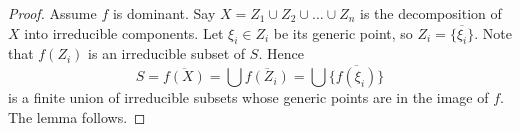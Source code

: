 \documentclass[10pt,a4paper]{amsart}
\theoremstyle{plain}
\theoremstyle{definition}
\theoremstyle{remark}
\numberwithin{equation}{subsection}
\begin{document}
\begin{proof}
Assume $f$ is dominant.
Say $X = Z_1 \cup Z_2 \cup \ldots \cup Z_n$ is the decomposition
of $X$ into irreducible components. Let $\xi_i \in Z_i$ be
its generic point, so $Z_i = \overline{\{\xi_i\}}$.
Note that $f(Z_i)$ is an irreducible subset of $S$.
Hence
$$
S = \overline{f(X)} = \bigcup \overline{f(Z_i)} =
\bigcup \overline{\{f(\xi_i)\}}
$$
is a finite union of irreducible subsets whose generic
points are in the image of $f$. The lemma follows.
\end{proof}
\end{document}
